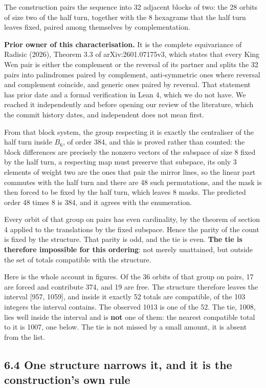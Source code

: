 \documentclass[11pt,a4paper]{article}
\begin{document}
The construction pairs the sequence into 32 adjacent blocks of two: the 28 orbits of size two of the half turn, together with the 8 hexagrams that the half turn leaves fixed, paired among themselves by complementation.

\textbf{Prior owner of this characterisation.} It is the complete equivariance of Radisic (2026), Theorem 3.3 of arXiv:2601.07175v3, which states that every King Wen pair is either the complement or the reversal of its partner and splits the 32 pairs into palindromes paired by complement, anti-symmetric ones where reversal and complement coincide, and generic ones paired by reversal. That statement has prior date and a formal verification in Lean 4, which we do not have. We reached it independently and before opening our review of the literature, which the commit history dates, and independent does not mean first.

From that block system, the group respecting it is exactly the centraliser of the half turn inside $B_6$, of order 384, and this is proved rather than counted: the block differences are precisely the nonzero vectors of the subspace of size 8 fixed by the half turn, a respecting map must preserve that subspace, its only 3 elements of weight two are the ones that pair the mirror lines, so the linear part commutes with the half turn and there are 48 such permutations, and the mask is then forced to be fixed by the half turn, which leaves 8 masks. The predicted order 48 times 8 is 384, and it agrees with the enumeration.

Every orbit of that group on pairs has even cardinality, by the theorem of section 4 applied to the translations by the fixed subspace. Hence the parity of the count is fixed by the structure. That parity is odd, and the tie is even. \textbf{The tie is therefore impossible for this ordering}: not merely unattained, but outside the set of totals compatible with the structure.

Here is the whole account in figures. Of the 36 orbits of that group on pairs, 17 are forced and contribute 374, and 19 are free. The structure therefore leaves the interval [957, 1059], and inside it exactly 52 totals are compatible, of the 103 integers the interval contains. The observed 1013 is one of the 52. The tie, 1008, lies well inside the interval and is \textbf{not} one of them: the nearest compatible total to it is 1007, one below. The tie is not missed by a small amount, it is absent from the list.

\subsection*{6.4 One structure narrows it, and it is the construction's own rule}
\end{document}
